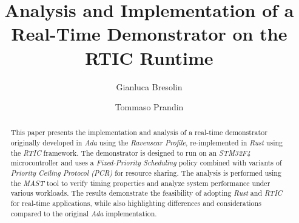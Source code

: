 \documentclass[sigconf, screen]{acmart}
\begin{document}
\title{Analysis and Implementation of a Real-Time Demonstrator on the RTIC Runtime}

\author{Gianluca Bresolin}

\author{Tommaso Prandin}


\begin{abstract}
  This paper presents the implementation and analysis of a real-time
  demonstrator originally developed in \textit{Ada} using the \textit{Ravenscar
  Profile}, re-implemented in \textit{Rust} using the \textit{RTIC} framework.  
  The demonstrator is designed to run on an \textit{STM32F4} microcontroller and
  uses a \textit{Fixed-Priority Scheduling} policy combined with variants of
  \textit{Priority Ceiling Protocol (PCR)} for resource sharing. 
  The analysis is performed using the \textit{MAST} tool to verify timing
  properties and analyze system performance under various workloads.   
  The results demonstrate the feasibility of adopting \textit{Rust} and
  \textit{RTIC} for real-time applications, while also highlighting differences 
  and considerations compared to the original \textit{Ada} implementation.
\end{abstract}
\end{document}
